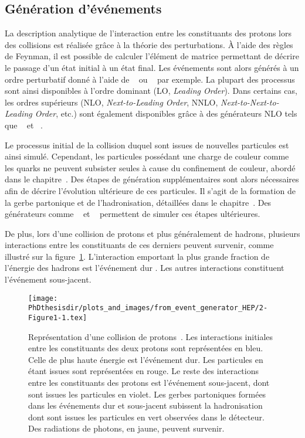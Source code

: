 \subsection{Génération d'événements}\label{chapter-LHC-section-MC-subsec-evt_gen}
La description analytique de l'interaction entre les constituants des protons lors des collisions est réalisée grâce à la théorie des perturbations.
À l'aide des règles de Feynman, il est possible de calculer l'\og élément de matrice \fg{} permettant de décrire le passage d'un état initial à un état final.
Les événements sont alors générés à un ordre perturbatif donné à l'aide de
\MADGRAPH~\cite{madgraph5}
ou
\PYTHIA~\cite{pythia6.4,pythia8.2}
par exemple.
La plupart des processus sont ainsi disponibles à l'ordre dominant (LO, \emph{Leading Order}).
Dans certains cas, les ordres supérieurs (NLO, \emph{Next-to-Leading Order}, NNLO, \emph{Next-to-Next-to-Leading Order}, etc.) sont également disponibles grâce à des générateurs NLO tels que
\POWHEG~\cite{Alioli:2010xd} et
\MCATNLO~\cite{MCATNLO}.
\par Le processus initial de la collision duquel sont issues de nouvelles particules est ainsi simulé.
Cependant, les particules possédant une charge de couleur comme les quarks ne peuvent subsister seules à cause du confinement de couleur, abordé dans le chapitre~.
Des étapes de génération supplémentaires sont alors nécessaires afin de décrire l'évolution ultérieure de ces particules.
Il s'agit de la formation de la gerbe partonique et de l'hadronisation, détaillées dans le chapitre~.
Des générateurs comme
\PYTHIA~\cite{pythia6.4,pythia8.2} et
\HERWIG~\cite{herwig}
permettent de simuler ces étapes ultérieures.
\par De plus, lors d'une collision de protons et plus généralement de hadrons, plusieurs interactions entre les constituants de ces derniers peuvent survenir, comme illustré sur la figure~\ref{fig-event_generator_HEP-2-Figure1-1}.
L'interaction emportant la plus grande fraction de l'énergie des hadrons est l'\og événement dur \fg{}.
Les autres interactions constituent l'événement sous-jacent.
\begin{figure}[h]
\centering
\texttt{[image: \\PhDthesisdir/plots\_and\_images/from\_event\_generator\_HEP/2-Figure1-1.tex]}
\caption[Représentation d'une collision de protons.]{Représentation d'une collision de protons~\cite{event_generator_HEP}. Les interactions initiales entre les constituants des deux protons sont représentées en bleu. Celle de plus haute énergie est l'événement dur. Les particules en étant issues sont représentées en rouge. Le reste des interactions entre les constituants des protons est l'événement sous-jacent, dont sont issues les particules en violet. Les gerbes partoniques formées dans les événements dur et sous-jacent subissent la hadronisation dont sont issues les particules en vert observées dans le détecteur. Des radiations de photons, en jaune, peuvent survenir.}
\label{fig-event_generator_HEP-2-Figure1-1}
\end{figure}
